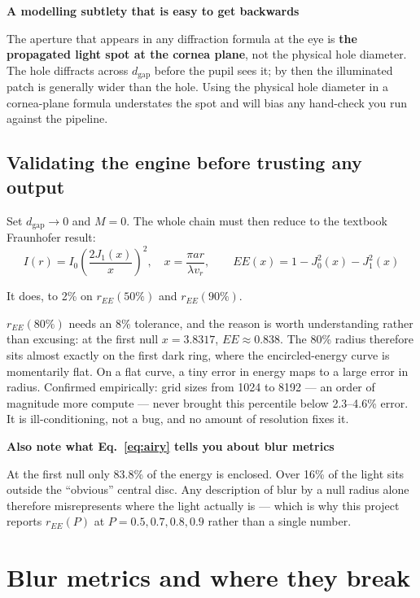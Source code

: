\documentclass[11pt]{report}
\newenvironment{keybox}[1]%
{\par\vspace{8pt}\begin{lrbox}{\kbsave}\begin{minipage}{0.88\textwidth}%
{\bfseries\color{hbblue}#1}\par\vspace{4pt}\ignorespaces}%
{\end{minipage}\end{lrbox}%
\begin{center}\setlength{\fboxrule}{1.2pt}\setlength{\fboxsep}{8pt}%
\fcolorbox{hbblue}{boxgrey}{\usebox{\kbsave}}\end{center}\vspace{8pt}\par}
\newenvironment{warnbox}[1]%
{\par\vspace{8pt}\begin{lrbox}{\wbsave}\begin{minipage}{0.88\textwidth}%
{\bfseries\color{warnred}#1}\par\vspace{4pt}\ignorespaces}%
{\end{minipage}\end{lrbox}%
\begin{center}\setlength{\fboxrule}{1.2pt}\setlength{\fboxsep}{8pt}%
\fcolorbox{warnred}{white}{\usebox{\wbsave}}\end{center}\vspace{8pt}\par}
\newcommand{\dgap}{d_{\text{gap}}}
\newcommand{\vr}{v_r}
\begin{document}
\begin{warnbox}{A modelling subtlety that is easy to get backwards}
The aperture that appears in any diffraction formula at the eye is \textbf{the propagated light
spot at the cornea plane}, not the physical hole diameter. The hole diffracts across $\dgap$
before the pupil sees it; by then the illuminated patch is generally wider than the hole. Using
the physical hole diameter in a cornea-plane formula understates the spot and will bias any
hand-check you run against the pipeline.
\end{warnbox}

\section{Validating the engine before trusting any output}

Set $\dgap \to 0$ and $M = 0$. The whole chain must then reduce to the textbook Fraunhofer result:
\begin{equation}
I(r) = I_0\left(\frac{2J_1(x)}{x}\right)^2,\quad x = \frac{\pi a r}{\lambda \vr},
\qquad
EE(x) = 1 - J_0^2(x) - J_1^2(x)
\label{eq:airy}
\end{equation}

It does, to 2\% on $r_{EE}(50\%)$ and $r_{EE}(90\%)$.

$r_{EE}(80\%)$ needs an 8\% tolerance, and the reason is worth understanding rather than excusing:
at the first null $x = 3.8317$, $EE \approx 0.838$. The 80\% radius therefore sits almost exactly
on the first dark ring, where the encircled-energy curve is momentarily flat. On a flat curve, a
tiny error in energy maps to a large error in radius. Confirmed empirically: grid sizes from
1024 to 8192 --- an order of magnitude more compute --- never brought this percentile below
2.3--4.6\% error. It is ill-conditioning, not a bug, and no amount of resolution fixes it.

\begin{keybox}{Also note what Eq.~\ref{eq:airy} tells you about blur metrics}
At the first null only 83.8\% of the energy is enclosed. Over 16\% of the light sits outside the
``obvious'' central disc. Any description of blur by a null radius alone therefore misrepresents
where the light actually is --- which is why this project reports $r_{EE}(P)$ at
$P = 0.5, 0.7, 0.8, 0.9$ rather than a single number.
\end{keybox}

\chapter{Blur metrics and where they break}
\end{document}
